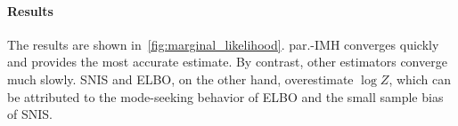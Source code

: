 \paragraph{Results}
The results are shown in~\cref{fig:marginal_likelihood}.
par.-IMH converges quickly and provides the most accurate estimate.
By contrast, other estimators converge much slowly.
SNIS and ELBO, on the other hand, overestimate \(\log Z\), which can be attributed to the mode-seeking behavior of ELBO and the small sample bias of SNIS.


